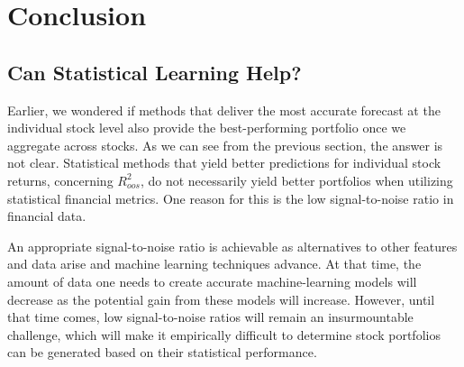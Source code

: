 %
\chapter{Conclusion}

\section{Can Statistical Learning Help?}

Earlier, we wondered if methods that deliver the most accurate forecast at the individual stock level also provide the best-performing portfolio once we aggregate across stocks. As we can see from the previous section, the answer is not clear. Statistical methods that yield better predictions for individual stock returns, concerning $R^2_{oos}$, do not necessarily yield better portfolios when utilizing statistical financial metrics. One reason for this is the low signal-to-noise ratio in financial data.

An appropriate signal-to-noise ratio is achievable as alternatives to other features and data arise and machine learning techniques advance. At that time, the amount of data one needs to create accurate machine-learning models will decrease as the potential gain from these models will increase. However, until that time comes, low signal-to-noise ratios will remain an insurmountable challenge, which will make it empirically difficult to determine stock portfolios can be generated based on their statistical performance.